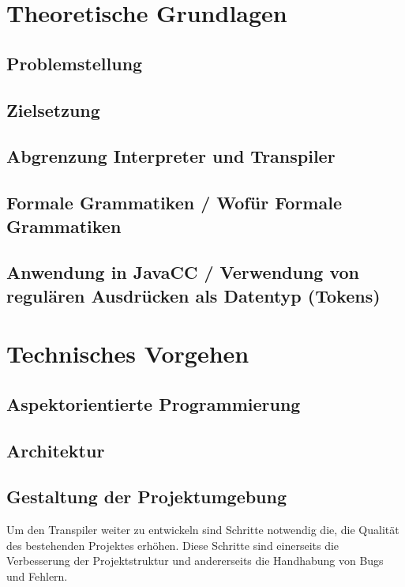 \section{Theoretische Grundlagen}
	\subsection{Problemstellung}
	\subsection{Zielsetzung}
	\subsection{Abgrenzung Interpreter und Transpiler}
	\subsection{Formale Grammatiken / Wofür Formale Grammatiken}
	\subsection{Anwendung in JavaCC / Verwendung von regulären Ausdrücken als Datentyp (Tokens)}

\section{Technisches Vorgehen}
\subsection{Aspektorientierte Programmierung}
\subsection{Architektur} 
\subsection{Gestaltung der Projektumgebung}
Um den Transpiler weiter zu entwickeln sind Schritte notwendig die, die Qualität des bestehenden Projektes erhöhen. Diese Schritte sind einerseits die Verbesserung der Projektstruktur und andererseits die Handhabung von Bugs und Fehlern.

